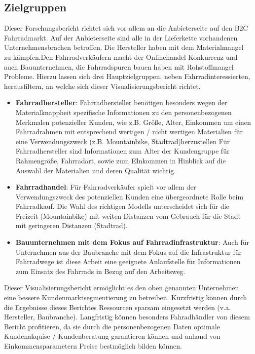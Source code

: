 \documentclass[usegeometry=true]{scrartcl}
\begin{document}
\subsection{Zielgruppen}

Dieser Forschungsbericht richtet sich vor allem an die Anbieterseite auf den B2C Fahrradmarkt. Auf der Anbieterseite sind alle in der Lieferkette vorhandenen Unternehmensbrachen betroffen. Die Hersteller haben mit dem Materialmangel zu kämpfen.Den Fahrradverkäufern macht der Onlinehandel Konkurrenz und auch Bauunternehmen, die Fahrradspuren bauen haben mit Rohstoffmangel Probleme.  Hierzu lassen sich drei Hauptzielgruppen, neben Fahrradinteressierten, herausfiltern, an welche sich dieser Visualisierungsbericht richtet.
\begin{itemize}
 \item \textbf{Fahrradhersteller}: 
 \newline Fahrradhersteller benötigen besonders wegen der Materialknappheit spezifische Informationen zu den personenbezogenen Merkmalen potenzieller Kunden, wie z.B. Größe, Alter, Einkommen um einen Fahrradrahmen mit entsprechend wertigen / nicht wertigen Materialien für eine Verwendungszweck (z.B. Mountainbike, Stadtrad)herzustellen 
 Für Fahrradhersteller sind Informationen zum Alter der Kundengruppe für Rahmengröße, Fahrradart, sowie zum EInkommen in Hinblick auf die Auswahl der Materialien und deren Qualität wichtig. 
 \item \textbf{Fahrradhandel}:
 \newline Für Fahrradverkäufer spielt vor allem der Verwendungszweck des potenziellen Kunden eine übergeordnete Rolle beim Fahrradkauf. Die Wahl des richtigen Modells unterscheidet sich für die Freizeit (Mountainbike) mit weiten Distanzen vom Gebrauch für die Stadt mit geringeren Distanzen (Stadtrad). 

 \item \textbf{Bauunternehmen mit dem Fokus auf Fahrradinfrastruktur}:
 \newline Auch für Unternehmen aus der Baubranche mit dem Fokus auf die Infrastruktur für Fahrradwege ist diese Arbeit eine geeignete Anlaufstelle für Informationen zum Einsatz des Fahrrads in Bezug auf den Arbeitsweg. 
\end{itemize}

Dieser Visualisierungsbericht ermöglicht es den oben genannten Unternehmen eine bessere Kundenmarktsegmentierung zu betreiben. Kurzfristig können durch die Ergebnisse dieses Berichtes Ressourcen sparsam eingesetzt werden (v.a. Hersteller, Baubranche). Langfristig können besonders Fahradhändler von diesem Bericht profitieren, da sie durch die personenbezogenen Daten optimale Kundenakquise / Kundenberatung garantieren können und anhand von Einkommensparametern Preise bestmöglich bilden können. 
\end{document}
